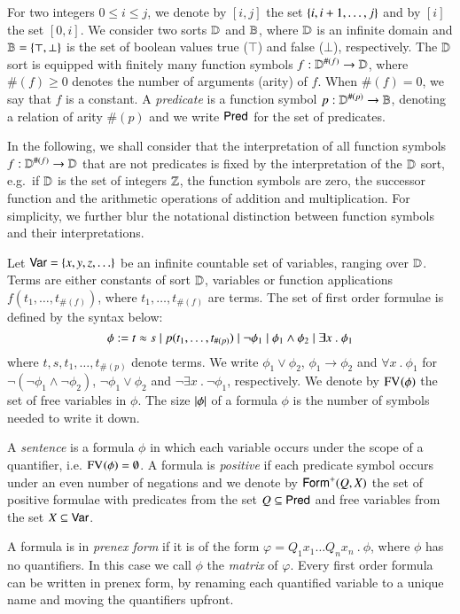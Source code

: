 For two integers $0 \leq i \leq j$, we denote by $[i,j]$ the set
$\{ i,i+1,\ldots,j \}$ and by $[i]$ the set $[0,i]$. We consider two
sorts $\mathbb{D}$ and $\mathbb{B}$, where $\mathbb{D}$ is an infinite domain and
$\mathbb{B} = \{ \top,\bot \}$ is the set of boolean values true ($\top$)
and false ($\bot$), respectively. The $\mathbb{D}$ sort is equipped with
finitely many function symbols $f : \mathbb{D}^{\#(f)} \rightarrow \mathbb{D}$,
where $\#(f)\geq0$ denotes the number of arguments (arity) of
$f$. When $\#(f)=0$, we say that $f$ is a constant. A \emph{predicate}
is a function symbol $p : \mathbb{D}^{\#(p)} \rightarrow \mathbb{B}$, denoting a
relation of arity $\#(p)$ and we write $\mathsf{Pred}$ for the set of
predicates. 

In the following, we shall consider that the interpretation of all
function symbols $f : \mathbb{D}^{\#(f)} \rightarrow \mathbb{D}$ that are not
predicates is fixed by the interpretation of the $\mathbb{D}$ sort,
e.g.\ if $\mathbb{D}$ is the set of integers ${\bf \mathbb{Z}}$, the function symbols
are zero, the successor function and the arithmetic operations of
addition and multiplication. For simplicity, we further blur the
notational distinction between function symbols and their
interpretations.

Let $\mathsf{Var} = \{ x,y,z,\ldots \}$ be an infinite countable set of
variables, ranging over $\mathbb{D}$. Terms are either constants of sort
$\mathbb{D}$, variables or function applications $f(t_1,\ldots,t_{\#(f)})$,
where $t_1,\ldots,t_{\#(f)}$ are terms. The set of first order
formulae is defined by the syntax below:
\[\phi := t \approx s \mid p(t_1,\ldots,t_{\#(p)}) 
\mid \neg \phi_1 \mid \phi_1 \wedge \phi_2 \mid \exists x ~.~
\phi_1 \] where $t,s,t_1,\ldots,t_{\#(p)}$ denote terms. We write
$\phi_1 \vee \phi_2$, $\phi_1 \rightarrow \phi_2$ and $\forall x ~.~
\phi_1$ for $\neg(\neg\phi_1 \wedge \neg\phi_2)$, $\neg\phi_1 \vee
\phi_2$ and $\neg\exists x ~.~ \neg\phi_1$, respectively. We denote by
$\mathrm{FV}_{}(\phi)$ the set of free variables in $\phi$. The size
${|{\phi}|}$ of a formula $\phi$ is the number of symbols needed to
write it down.

A \emph{sentence} is a formula $\phi$ in which each variable occurs
under the scope of a quantifier, i.e. $\mathrm{FV}_{}(\phi) = \emptyset$.  A
formula is \emph{positive} if each predicate symbol occurs under an
even number of negations and we denote by $\mathsf{Form}^+(Q,X)$ the set of
positive formulae with predicates from the set $Q \subseteq \mathsf{Pred}$
and free variables from the set $X \subseteq \mathsf{Var}$.

A formula is in \emph{prenex form} if it is of the form $\varphi =
Q_1x_1 \ldots Q_nx_n ~.~ \phi$, where $\phi$ has no quantifiers. In
this case we call $\phi$ the \emph{matrix} of $\varphi$. Every
first order formula can be written in prenex form, by renaming each
quantified variable to a unique name and moving the quantifiers
upfront.

